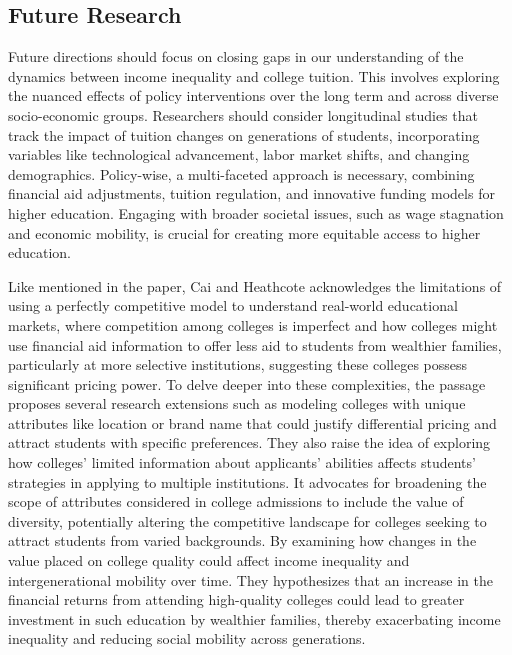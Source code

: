 \documentclass[
  letterpaper,
  DIV=11,
  numbers=noendperiod]{scrartcl}
\begin{document}
\subsection{Future Research}\label{future-research}

Future directions should focus on closing gaps in our understanding of
the dynamics between income inequality and college tuition. This
involves exploring the nuanced effects of policy interventions over the
long term and across diverse socio-economic groups. Researchers should
consider longitudinal studies that track the impact of tuition changes
on generations of students, incorporating variables like technological
advancement, labor market shifts, and changing demographics.
Policy-wise, a multi-faceted approach is necessary, combining financial
aid adjustments, tuition regulation, and innovative funding models for
higher education. Engaging with broader societal issues, such as wage
stagnation and economic mobility, is crucial for creating more equitable
access to higher education.

Like mentioned in the paper, Cai and Heathcote acknowledges the
limitations of using a perfectly competitive model to understand
real-world educational markets, where competition among colleges is
imperfect and how colleges might use financial aid information to offer
less aid to students from wealthier families, particularly at more
selective institutions, suggesting these colleges possess significant
pricing power. To delve deeper into these complexities, the passage
proposes several research extensions such as modeling colleges with
unique attributes like location or brand name that could justify
differential pricing and attract students with specific preferences.
They also raise the idea of exploring how colleges' limited information
about applicants' abilities affects students' strategies in applying to
multiple institutions. It advocates for broadening the scope of
attributes considered in college admissions to include the value of
diversity, potentially altering the competitive landscape for colleges
seeking to attract students from varied backgrounds. By examining how
changes in the value placed on college quality could affect income
inequality and intergenerational mobility over time. They hypothesizes
that an increase in the financial returns from attending high-quality
colleges could lead to greater investment in such education by wealthier
families, thereby exacerbating income inequality and reducing social
mobility across generations.
\end{document}
